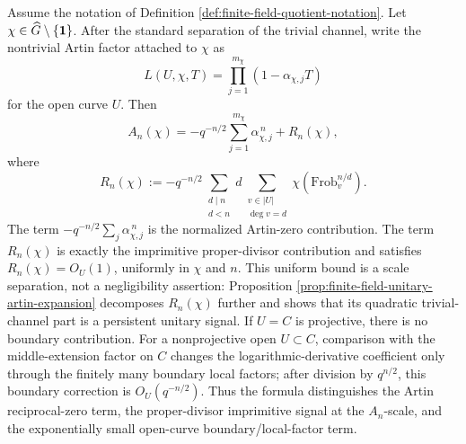 \begin{proposition}\label{prop:finite-field-normalized-reciprocal-zero-formula}
Assume the notation of Definition \ref{def:finite-field-quotient-notation}. Let \(\chi\in\widehat G\setminus\{\mathbf{1}\}\). After the standard separation of the trivial channel, write the nontrivial Artin factor attached to \(\chi\) as
\[
L(U,\chi,T)=\prod_{j=1}^{m_\chi}(1-\alpha_{\chi,j}T)
\]
for the open curve \(U\). Then
\[
A_n(\chi)
=
-q^{-n/2}\sum_{j=1}^{m_\chi}\alpha_{\chi,j}^{\,n}
+
R_n(\chi),
\]
where
\[
R_n(\chi):=
-q^{-n/2}
\sum_{\substack{d\mid n\\ d<n}}
 d\sum_{\substack{v\in |U|\\ \deg v=d}}
 \chi\!\left(\mathrm{Frob}_v^{n/d}\right).
\]
The term \(-q^{-n/2}\sum_j\alpha_{\chi,j}^{\,n}\) is the normalized Artin-zero contribution. The term \(R_n(\chi)\) is exactly the imprimitive proper-divisor contribution and satisfies \(R_n(\chi)=O_U(1)\), uniformly in \(\chi\) and \(n\). This uniform bound is a scale separation, not a negligibility assertion: Proposition \ref{prop:finite-field-unitary-artin-expansion} decomposes \(R_n(\chi)\) further and shows that its quadratic trivial-channel part is a persistent unitary signal. If \(U=C\) is projective, there is no boundary contribution. For a nonprojective open \(U\subset C\), comparison with the middle-extension factor on \(C\) changes the logarithmic-derivative coefficient only through the finitely many boundary local factors; after division by \(q^{n/2}\), this boundary correction is \(O_U(q^{-n/2})\). Thus the formula distinguishes the Artin reciprocal-zero term, the proper-divisor imprimitive signal at the \(A_n\)-scale, and the exponentially small open-curve boundary/local-factor term.
\end{proposition}

